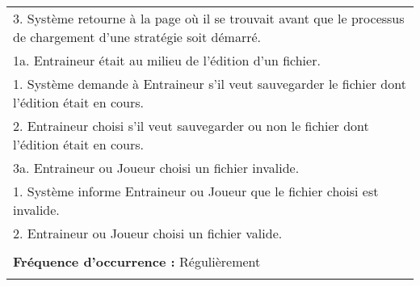 \begin{tabular}{|p{16cm}|}
	\hspace{1cm}3. Système retourne à la page où il se trouvait avant que le processus de chargement d'une stratégie soit démarré.\\
	1a. Entraineur était au milieu de l'édition d'un fichier.\\
	\hspace{1cm}1. Système demande à Entraineur s'il veut sauvegarder le fichier dont l'édition était en cours.\\
	\hspace{1cm}2. Entraineur choisi s'il veut sauvegarder ou non le fichier dont l'édition était en cours.\\
	3a. Entraineur ou Joueur choisi un fichier invalide.\\
	\hspace{1cm}1. Système informe Entraineur ou Joueur que le fichier choisi est invalide.\\
	\hspace{1cm}2. Entraineur ou Joueur choisi un fichier valide.\\
	\\
	\textbf{Fréquence d'occurrence :} Régulièrement\\
	\\
	\hline
\end{tabular}